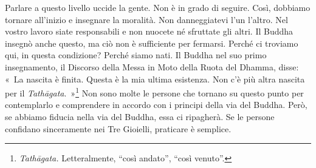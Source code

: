 Parlare a questo livello uccide la gente. Non è in grado di seguire.
Così, dobbiamo tornare all'inizio e insegnare la moralità. Non
danneggiatevi l'un l'altro. Nel vostro lavoro siate responsabili e non
nuocete né sfruttate gli altri. Il Buddha insegnò anche questo, ma ciò
non è sufficiente per fermarsi. Perché ci troviamo qui, in questa
condizione? Perché siamo nati. Il Buddha nel suo primo insegnamento, il
Discorso della Messa in Moto della Ruota del Dhamma, disse: «~La nascita
è finita. Questa è la mia ultima esistenza. Non c'è più altra nascita
per il \emph{Tathāgata}.~»\footnote{\emph{Tathāgata.} Letteralmente,
  ``così andato'', ``così venuto''.} Non sono molte le persone che
tornano su questo punto per contemplarlo e comprendere in accordo con i
principi della via del Buddha. Però, se abbiamo fiducia nella via del
Buddha, essa ci ripagherà. Se le persone confidano sinceramente nei Tre
Gioielli, praticare è semplice.

